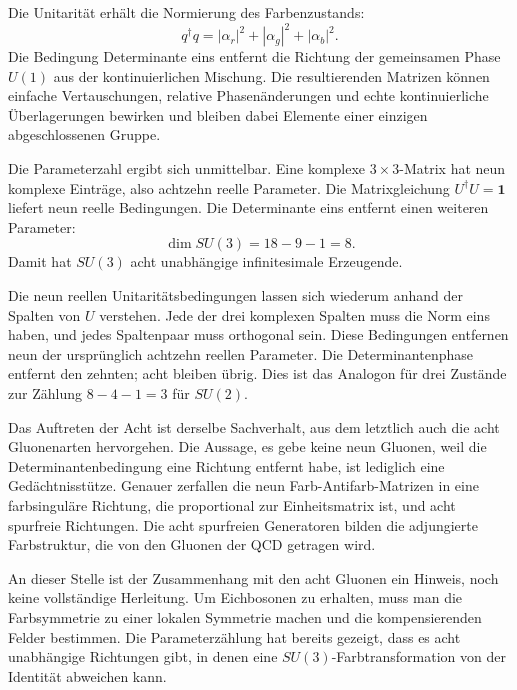 Die Unitarität erhält die Normierung des Farbenzustands:
\begin{equation}
q^\dagger q
=|\alpha_r|^2+|\alpha_g|^2+|\alpha_b|^2.
\end{equation}
Die Bedingung Determinante eins entfernt die Richtung der gemeinsamen Phase \(U(1)\) aus der kontinuierlichen Mischung. Die resultierenden Matrizen können einfache Vertauschungen, relative Phasenänderungen und echte kontinuierliche Überlagerungen bewirken und bleiben dabei Elemente einer einzigen abgeschlossenen Gruppe.

Die Parameterzahl ergibt sich unmittelbar. Eine komplexe \(3\times3\)-Matrix hat neun komplexe Einträge, also achtzehn reelle Parameter. Die Matrixgleichung \(U^\dagger U=\boldsymbol 1\) liefert neun reelle Bedingungen. Die Determinante eins entfernt einen weiteren Parameter:
\begin{equation}
\dim SU(3)=18-9-1=8.
\end{equation}
Damit hat \(SU(3)\) acht unabhängige infinitesimale Erzeugende.

Die neun reellen Unitaritätsbedingungen lassen sich wiederum anhand der Spalten von \(U\) verstehen. Jede der drei komplexen Spalten muss die Norm eins haben, und jedes Spaltenpaar muss orthogonal sein. Diese Bedingungen entfernen neun der ursprünglich achtzehn reellen Parameter. Die Determinantenphase entfernt den zehnten; acht bleiben übrig. Dies ist das Analogon für drei Zustände zur Zählung \(8-4-1=3\) für \(SU(2)\).

Das Auftreten der Acht ist derselbe Sachverhalt, aus dem letztlich auch die acht Gluonenarten hervorgehen. Die Aussage, es gebe keine neun Gluonen, weil die Determinantenbedingung eine Richtung entfernt habe, ist lediglich eine Gedächtnisstütze. Genauer zerfallen die neun Farb-Antifarb-Matrizen in eine farbsinguläre Richtung, die proportional zur Einheitsmatrix ist, und acht spurfreie Richtungen. Die acht spurfreien Generatoren bilden die adjungierte Farbstruktur, die von den Gluonen der QCD getragen wird.

An dieser Stelle ist der Zusammenhang mit den acht Gluonen ein Hinweis, noch keine vollständige Herleitung. Um Eichbosonen zu erhalten, muss man die Farbsymmetrie zu einer lokalen Symmetrie machen und die kompensierenden Felder bestimmen. Die Parameterzählung hat bereits gezeigt, dass es acht unabhängige Richtungen gibt, in denen eine \(SU(3)\)-Farbtransformation von der Identität abweichen kann.


